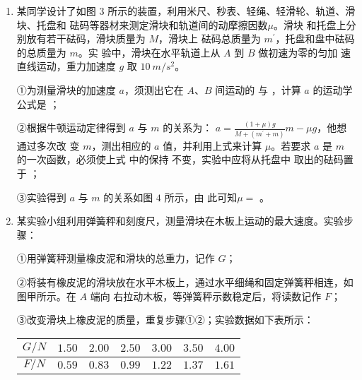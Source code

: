 \begin{enumerate}
\newpage
\item 
{}
某同学设计了如图 $ 3 $ 所示的装置，利用米尺、秒表、轻绳、轻滑轮、轨道、滑块、托盘和
砝码等器材来测定滑块和轨道间的动摩擦因数$ \mu $。滑块
和托盘上分别放有若干砝码，滑块质量为 $ M $，滑块上
砝码总质量为 $ m ^{\prime} $，托盘和盘中砝码的总质量为 $ m $。实
验中，滑块在水平轨道上从 $ A $ 到 $ B $ 做初速为零的匀加
速直线运动，重力加速度 $ g $ 取 $ 10 \ m/s^{2} $。
\begin{figure}[h!]
\centering

\end{figure}

①为测量滑块的加速度 $ a $，须测出它在 $ A $、$ B $ 间运动的
与
，计算 $ a $ 的运动学公式是
；


②根据牛顿运动定律得到 $ a $ 与 $ m $ 的关系为：
$a=\frac{(1+\mu) g}{M+\left(m^{\prime}+m\right)} m-\mu g$，他想通过多次改
变 $ m $，测出相应的 $ a $ 值，并利用上式来计算
$ \mu $。若要求 $ a $ 是 $ m $ 的一次函数，必须使上式
中的保持  不变，实验中应将从托盘中
取出的砝码置于
；

③实验得到 $ a $ 与 $ m $ 的关系如图 $ 4 $ 所示，由
此可知$ \mu = $ 。
\begin{figure}[h!]
\centering

\end{figure}



\newpage
\item 
{}
某实验小组利用弹簧秤和刻度尺，测量滑块在木板上运动的最大速度。实验步骤：

①用弹簧秤测量橡皮泥和滑块的总重力，记作 $ G $；

②将装有橡皮泥的滑块放在水平木板上，通过水平细绳和固定弹簧秤相连，如图甲所示。在 $ A $ 端向
右拉动木板，等弹簧秤示数稳定后，将读数记作 $ F $；

③改变滑块上橡皮泥的质量，重复步骤①②；实验数据如下表所示：
\begin{table}[h!]
\centering 
\begin{tabular}{|c|c|c|c|c|c|c|}
\hline 
$ G/N $ & $ 1.50 $ & $ 2.00 $ & $ 2.50 $ & $ 3.00 $ & $ 3.50 $ & $ 4.00 $
 \\
\hline
$ F/N $ & $ 0.59 $ & $ 0.83 $ & $ 0.99 $ & $ 1.22 $ & $ 1.37 $ & $ 1.61 $\\ 
\hline 
\end{tabular}
\end{table} 




\end{enumerate}
